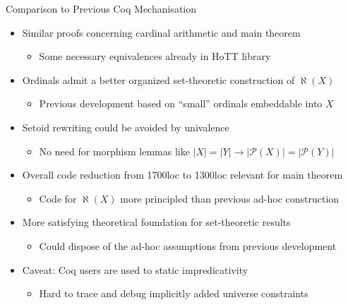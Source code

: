 \documentclass[xcolor=dvipsnames,compress,aspectratio=169]{beamer}
\newcommand{\MCL}[1]{\ensuremath{\mathcal{#1}}\xspace} %
\newcommand{\Pow}{\MCL P}
\begin{document}
\begin{frame}{Comparison to Previous Coq Mechanisation}
	\pause
	\begin{itemize}
		\item
		Similar proofs concerning cardinal arithmetic and main theorem
		\begin{itemize}
			\item Some necessary equivalences already in HoTT library
		\end{itemize}
		\vspace{0.2cm}
		\pause
		\item
		Ordinals admit a better organized set-theoretic construction of $\aleph(X)$
		\begin{itemize}
			\item Previous development based on ``small'' ordinals embeddable into $X$
		\end{itemize}
		\vspace{0.2cm}
		\pause
		\item
		Setoid rewriting could be avoided by univalence
		\begin{itemize}
			\item No need for morphism lemmas like $|X|=|Y|\to |\Pow(X)|=|\Pow(Y)|$
		\end{itemize}
		\vspace{0.2cm}
		\pause
		\item
		Overall code reduction from 1700loc to 1300loc relevant for main theorem
		\begin{itemize}
			\item Code for $\aleph(X)$ more principled than previous ad-hoc construction
		\end{itemize}
		\vspace{0.2cm}
		\pause
		\item
		More satisfying theoretical foundation for set-theoretic results
		\begin{itemize}
			\item
			Could dispose of the ad-hoc assumptions from previous development
		\end{itemize}
		\vspace{0.2cm}
		\pause
		\item
		Caveat: Coq users are used to static impredicativity
		\begin{itemize}
			\item
			Hard to trace and debug implicitly added universe constraints
		\end{itemize}
	\end{itemize}
\end{frame}
\end{document}
